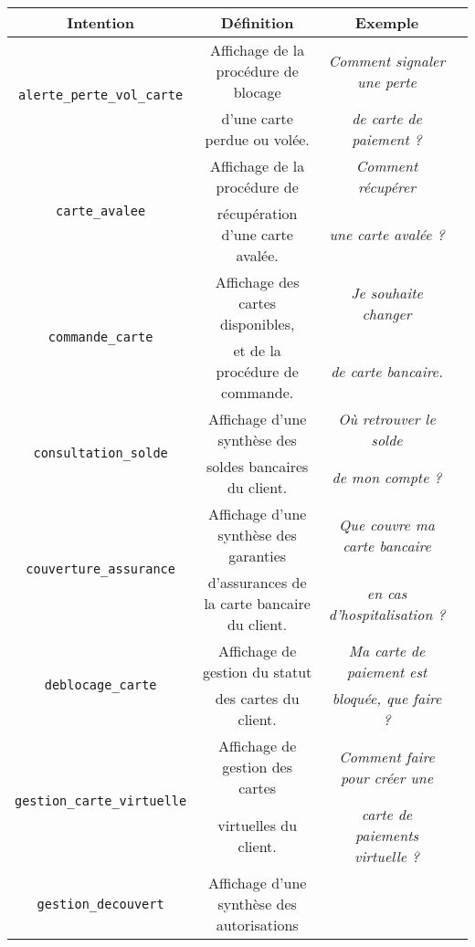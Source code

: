 		\begin{table}[!htb]
			\begin{center}
			\begin{scriptsize}
			\begin{tabular}{|c|c|c|c|}
			
				\hline
				\rowcolor{colorTableHeader!15}
				\textbf{Intention}
					& \textbf{Définition}
					& \textbf{Exemple}
					\tabularnewline
					\hline \hline
				\multirow{2}{*}{\texttt{alerte\_perte\_vol\_carte}}
					& Affichage de la procédure de blocage
					& \textit{Comment signaler une perte}
					\tabularnewline
					& d'une carte perdue ou volée.
					& \textit{de carte de paiement ?}
					\tabularnewline
					\hline
				\multirow{2}{*}{\texttt{carte\_avalee}}
					& Affichage de la procédure de
					& \textit{Comment récupérer}
					\tabularnewline
					& récupération d'une carte avalée.
					& \textit{une carte avalée ?}
					\tabularnewline
					\hline
				\multirow{2}{*}{\texttt{commande\_carte}}
					& Affichage des cartes disponibles,
					& \textit{Je souhaite changer}
					\tabularnewline
					& et de la procédure de commande.
					& \textit{de carte bancaire.}
					\tabularnewline
					\hline
				\multirow{2}{*}{\texttt{consultation\_solde}}
					& Affichage d'une synthèse des
					& \textit{Où retrouver le solde}
					\tabularnewline
					& soldes bancaires du client.
					& \textit{ de mon compte ?}
					\tabularnewline
					\hline
				\multirow{2}{*}{\texttt{couverture\_assurance}}
					& Affichage d'une synthèse des garanties
					& \textit{Que couvre ma carte bancaire}
					\tabularnewline
					& d'assurances de la carte bancaire du client.
					& \textit{en cas d'hospitalisation ?}
					\tabularnewline
					\hline
				\multirow{2}{*}{\texttt{deblocage\_carte}}
					& Affichage de gestion du statut
					& \textit{Ma carte de paiement est}
					\tabularnewline
					& des cartes du client.
					& \textit{bloquée, que faire ?}
					\tabularnewline
					\hline
				\multirow{2}{*}{\texttt{gestion\_carte\_virtuelle}}
					& Affichage de gestion des cartes
					& \textit{Comment faire pour créer une}
					\tabularnewline
					& virtuelles du client.
					& \textit{carte de paiements virtuelle ?}
					\tabularnewline
					\hline
				\multirow{2}{*}{\texttt{gestion\_decouvert}}
					& Affichage d'une synthèse des autorisations

\end{tabular}
\end{scriptsize}
\end{center}
\end{table}
